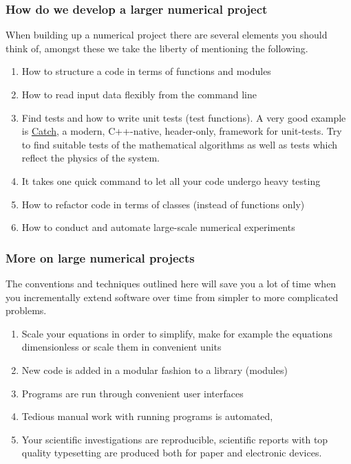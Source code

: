 \documentclass{beamer}
\begin{document}
\begin{frame}
\frametitle{How do we develop a larger numerical project}

When building up a numerical project there are several elements you should think of, amongst these we take the liberty of mentioning the following.
\begin{enumerate}
 \item How to structure a code in terms of functions and modules

 \item How to read input data flexibly from the command line

 \item Find tests and how to write unit tests (test functions). A very good example is \href{{https://github.com/philsquared/Catch}}{Catch}, a modern, C++-native, header-only, framework for unit-tests. Try to find suitable tests of the mathematical algorithms as well as tests which reflect the physics of the system. 

 \item It takes one quick command to let all your code undergo heavy testing

 \item How to refactor code in terms of classes (instead of functions only)

 \item How to conduct and automate large-scale numerical experiments
\end{enumerate}

\noindent
\end{frame}

\begin{frame}
\frametitle{More on large numerical projects}

The conventions and techniques outlined here will save you a lot of time when you incrementally extend software over time from simpler to more complicated problems.
\begin{enumerate}
\item Scale your equations in order to simplify, make for example the equations dimensionless or scale them in convenient units

\item New code is added in a modular fashion to a library (modules)

\item Programs are run through convenient user interfaces

\item Tedious manual work with running programs is automated,

\item Your scientific investigations are reproducible, scientific reports with top quality typesetting are produced both for paper and electronic devices.
\end{enumerate}

\noindent
\end{frame}
\end{document}
